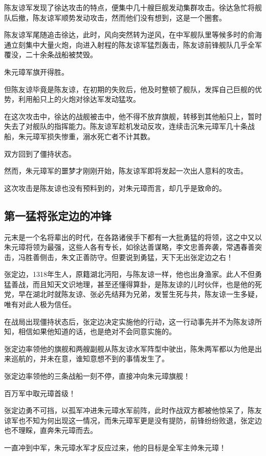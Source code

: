 \begin{multicols}{\theparacolNo}
		陈友谅军发现了徐达攻击的特点，便集中几十艘巨舰发动集群攻击。徐达急忙将舰队后撤，陈友谅军顺势发动攻击，然而他们没有想到，这是一个圈套。

		陈友谅军尾随追击徐达，此时，风向突然转为逆风，在中军舰队里等候多时的俞海通立刻集中大量火炮，向进入射程的陈友谅军猛烈轰击，陈友谅前锋舰队几乎全军覆没，二十余条战船被焚毁。

		朱元璋军旗开得胜。

		但陈友谅毕竟是陈友谅，在初期的失败后，他及时整顿了舰队，发挥自己巨舰的优势，利用船只上的火炮对徐达军发动猛攻。

		在这次攻击中，徐达的战舰被击中，他不得不放弃旗舰，转移到其他船只上，暂时失去了对舰队的指挥能力。陈友谅军趁机发动反攻，连续击沉朱元璋军几十条战船，朱元璋军损失惨重，溺水死亡者不计其数。

		双方回到了僵持状态。

		然而，朱元璋军的噩梦才刚刚开始，陈友谅军即将发起一次出人意料的攻击。

		这次攻击是陈友谅也没有预料到的，对朱元璋而言，却几乎是致命的。

		\subsection{第一猛将张定边的冲锋}
		元末是一个名将辈出的时代，在各路诸侯手下都有一大批勇猛的将领，这之中又以朱元璋将领为最强，这些人各有专长，如徐达善谋略，李文忠善奔袭，常遇春善突击，冯胜善侧击，朱文正善防守。但要说到勇猛，天下无出张定边之右！

		张定边，1318年生人，原籍湖北沔阳，与陈友谅一样，他也出身渔家。此人不但勇猛善战，而且知天文识地理，甚至还懂得算卦，是陈友谅的儿时伙伴，也是他的死党，早在湖北时就陈友谅、张必先结拜为兄弟，发誓生死与共，陈友谅一生多疑，唯有对此人极为信任。

		在战局出现僵持状态后，张定边决定实施他的行动，这一行动事先并不为陈友谅所知，相信如果他知道的话，也是绝对不会同意实施的。

		张定边率领他的旗舰和两艘副舰从陈友谅水军阵型中驶出，陈朱两军都以为他是出来巡航的，并未在意，谁知意想不到的事情发生了。

		张定边率领他的三条战船一刻不停，直接冲向朱元璋旗舰！

		百万军中取元璋首级！

		张定边勇不可挡，以孤军冲进朱元璋水军前阵，此时作战双方都被他惊呆了，陈友谅军也不知为何出现这一情况，而朱元璋军更是没有提防，前锋纷纷败退，张定边也不理睬，直奔朱元璋而去。

		一直冲到中军，朱元璋水军才反应过来，他的目标是全军主帅朱元璋！


\end{multicols}

